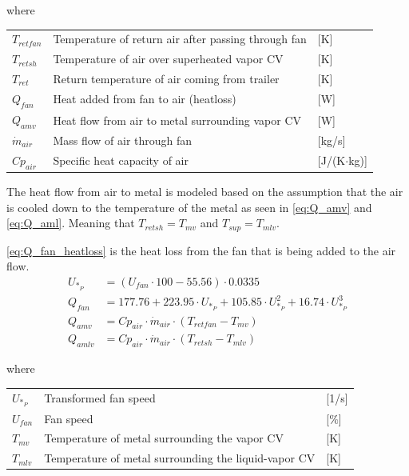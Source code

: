 where

\begin{center}
	\begin{tabular}{l p{10cm} l}
		$T_{retfan}$    & Temperature of return air after passing through fan & [\si{K}]                          \\
		$T_{retsh}$     & Temperature of air over superheated vapor CV        & [\si{K}]                          \\
		$T_{ret}$       & Return temperature of air coming from trailer       & [\si{K}]                          \\
		$Q_{fan}$       & Heat added from fan to air (heatloss)               & [\si{W}]                          \\
		$Q_{amv}$       & Heat flow from air to metal surrounding vapor CV    & [\si{W}]                          \\
		$\dot{m}_{air}$ & Mass flow of air through fan                        & [\si{kg}/\si{s}]                  \\
		$Cp_{air}$      & Specific heat capacity of air                       & [\si{J}/(\si{K}$ \cdot $\si{kg})]
	\end{tabular}
\end{center}

\medskip
The heat flow from air to metal is modeled based on the assumption that the air is cooled down to the temperature of the metal as seen in \cref{eq:Q_amv} and \cref{eq:Q_aml}. Meaning that $T_{retsh} = T_{mv}$ and $T_{sup} = T_{mlv}$.

\cref{eq:Q_fan_heatloss} is the heat loss from the fan that is being added to the air flow. 
\begin{align}
	U_{*_P} & = \left( U_{fan}\cdot 100 - 55.56 \right) \cdot 0.0335                                         \\
	Q_{fan} & = 177.76 + 223.95 \cdot U_{*_P} + 105.85 \cdot U_{*_P}^2 + 16.74 \cdot U_{*_P}^3	\label{eq:Q_fan_heatloss} \\
	Q_{amv} & = Cp_{air} \cdot \dot{m}_{air} \cdot (T_{retfan} - T_{mv}) 	\label{eq:Q_amv}                                \\
	Q_{amlv} & = Cp_{air} \cdot \dot{m}_{air} \cdot (T_{retsh} - T_{mlv}) 	\label{eq:Q_aml}
\end{align}

where
\smallskip
\begin{center}
	\begin{tabular}{l p{10cm} l}
		$U_{*_P}$       & Transformed fan speed                                & [1/\si{s}]                        \\
		$U_{fan}$       & Fan speed                                            & [$\%$]                        \\
		$T_{mv}$        & Temperature of metal surrounding the vapor CV        & [\si{K}]                          \\
		$T_{mlv}$       & Temperature of metal surrounding the liquid-vapor CV & [\si{K}]
	\end{tabular}
\end{center}

